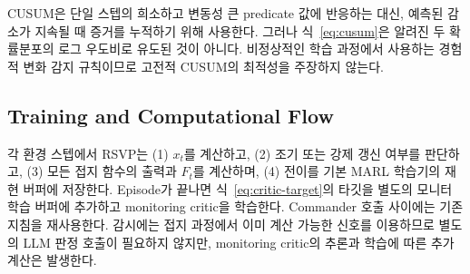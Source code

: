 CUSUM은 단일 스텝의 희소하고 변동성 큰 predicate 값에 반응하는 대신, 예측된 감소가
지속될 때 증거를 누적하기 위해 사용한다. 그러나 식~\eqref{eq:cusum}은 알려진 두
확률분포의 로그 우도비로 유도된 것이 아니다. 비정상적인 학습 과정에서 사용하는
경험적 변화 감지 규칙이므로 고전적 CUSUM의 최적성을 주장하지 않는다.

\subsection{Training and Computational Flow}

각 환경 스텝에서 RSVP는 (1) $x_t$를 계산하고, (2) 조기 또는 강제 갱신 여부를
판단하고, (3) 모든 접지 함수의 출력과 $F_t$를 계산하며, (4) 전이를 기본 MARL
학습기의 재현 버퍼에 저장한다. Episode가 끝나면 식~\eqref{eq:critic-target}의 타깃을
별도의 모니터 학습 버퍼에 추가하고 monitoring critic을 학습한다. Commander 호출
사이에는 기존 지침을 재사용한다. 감시에는 접지 과정에서 이미 계산 가능한 신호를
이용하므로 별도의 LLM 판정 호출이 필요하지 않지만, monitoring critic의 추론과
학습에 따른 추가 계산은 발생한다.
